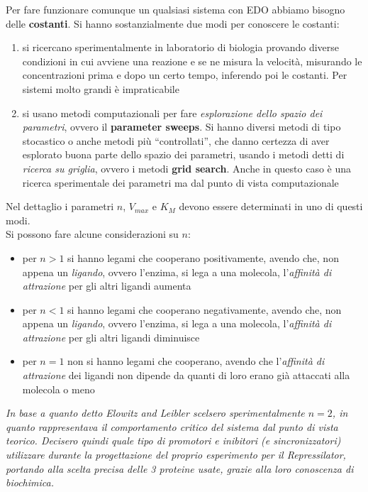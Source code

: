 \documentclass[a4paper,12pt, oneside]{book}
\begin{document}
Per fare funzionare comunque un qualsiasi sistema con EDO abbiamo bisogno delle
\textbf{costanti}. Si hanno sostanzialmente due modi per conoscere le costanti:
\begin{enumerate}
  \item si ricercano sperimentalmente in laboratorio di biologia provando
  diverse condizioni in cui avviene una reazione e se ne misura la velocità,
  misurando le concentrazioni prima e dopo un certo tempo, inferendo poi le
  costanti. Per sistemi molto grandi è impraticabile
  \item si usano metodi computazionali per fare \textit{esplorazione dello
    spazio dei parametri}, ovvero il \textbf{parameter sweeps}. Si hanno diversi
  metodi di tipo stocastico o anche metodi più ``controllati'', che danno
  certezza di aver esplorato buona parte dello spazio dei parametri, usando i
  metodi detti di \textit{ricerca su griglia}, ovvero i metodi \textbf{grid
    search}. Anche in questo caso è una ricerca sperimentale dei parametri ma
  dal punto di vista computazionale
\end{enumerate}
Nel dettaglio i parametri $n$, $V_{max}$ e $K_M$ devono essere determinati in
uno di questi modi.\\
Si possono fare alcune considerazioni su $n$:
\begin{itemize}
  \item per $n>1$ si hanno legami che cooperano positivamente, avendo che, non
  appena un \textit{ligando}, ovvero l'enzima, si lega a una molecola,
  l'\textit{affinità di attrazione} per gli altri ligandi aumenta 
  \item per $n<1$ si hanno legami che cooperano negativamente, avendo che, non
  appena un \textit{ligando}, ovvero l'enzima, si lega a una molecola,
  l'\textit{affinità di attrazione} per gli altri ligandi diminuisce
  \item per $n=1$ non si hanno legami che cooperano, avendo che
  l'\textit{affinità di attrazione} dei ligandi non dipende da quanti di loro
  erano già attaccati alla molecola o meno 
\end{itemize}
\textit{In base a quanto detto Elowitz and Leibler scelsero sperimentalmente
  $n=2$, in quanto rappresentava il \emph{comportamento critico} del sistema dal
  punto di vista teorico. Decisero quindi quale tipo di promotori e inibitori (e
  sincronizzatori) utilizzare durante la progettazione del proprio esperimento
  per il Repressilator, portando alla scelta precisa delle 3 proteine usate,
  grazie alla loro conoscenza di biochimica.}\\ 
\end{document}
